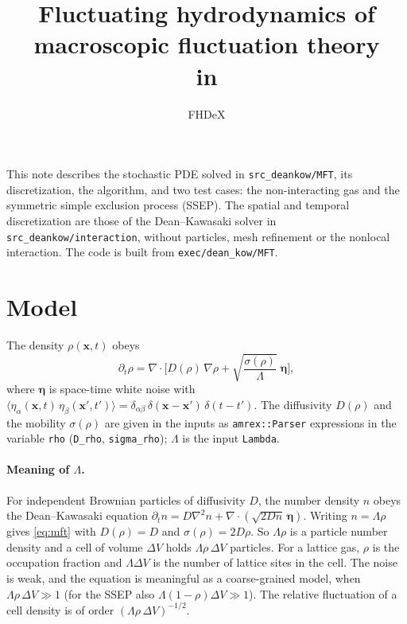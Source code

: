 \documentclass[11pt]{article}
\title{Fluctuating hydrodynamics of macroscopic fluctuation theory\\
in \code{src\_deankow/MFT}}
\author{FHDeX}
\date{}
\newcommand{\code}[1]{\texttt{#1}}
\begin{document}
\maketitle

\noindent This note describes the stochastic PDE solved in
\code{src\_deankow/MFT}, its discretization, the algorithm, and two test
cases: the non-interacting gas and the symmetric simple exclusion process
(SSEP). The spatial and temporal discretization are those of the
Dean--Kawasaki solver in \code{src\_deankow/interaction}, without
particles, mesh refinement or the nonlocal interaction. The code is built
from \code{exec/dean\_kow/MFT}.

\section{Model}

The density $\rho(\mathbf{x},t)$ obeys
\begin{equation}\label{eq:mft}
  \partial_t \rho = \nabla\cdot\Big[ D(\rho)\,\nabla\rho
     + \sqrt{\frac{\sigma(\rho)}{\Lambda}}\;\boldsymbol{\eta} \Big],
\end{equation}
where $\boldsymbol{\eta}$ is space-time white noise with
$\langle \eta_\alpha(\mathbf{x},t)\,\eta_\beta(\mathbf{x}',t')\rangle
 = \delta_{\alpha\beta}\,\delta(\mathbf{x}-\mathbf{x}')\,\delta(t-t')$.
The diffusivity $D(\rho)$ and the mobility $\sigma(\rho)$ are given in the
inputs as \code{amrex::Parser} expressions in the variable \code{rho}
(\code{D\_rho}, \code{sigma\_rho}); $\Lambda$ is the input \code{Lambda}.

\paragraph{Meaning of $\Lambda$.}
For independent Brownian particles of diffusivity $D$, the number density
$n$ obeys the Dean--Kawasaki equation
$\partial_t n = D\nabla^2 n + \nabla\cdot(\sqrt{2Dn}\,\boldsymbol\eta)$.
Writing $n=\Lambda\rho$ gives \eqref{eq:mft} with $D(\rho)=D$ and
$\sigma(\rho)=2D\rho$. So $\Lambda\rho$ is a particle number density and a
cell of volume $\Delta V$ holds $\Lambda\rho\,\Delta V$ particles. For a
lattice gas, $\rho$ is the occupation fraction and $\Lambda\Delta V$ is the
number of lattice sites in the cell. The noise is weak, and the equation is
meaningful as a coarse-grained model, when $\Lambda\rho\,\Delta V\gg1$
(for the SSEP also $\Lambda(1-\rho)\Delta V\gg1$). The relative
fluctuation of a cell density is of order $(\Lambda\rho\,\Delta V)^{-1/2}$.
\end{document}
